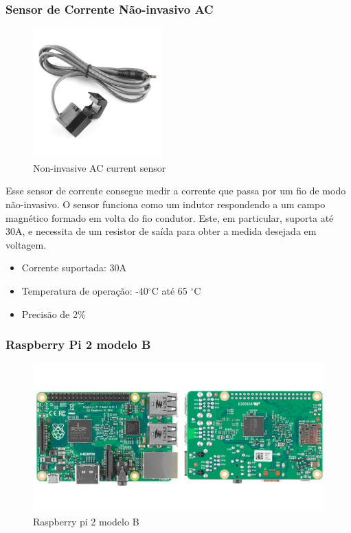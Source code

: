 \subsubsection{Sensor de Corrente Não-invasivo AC}
\begin{figure}[H]
\begin{center}
\includegraphics[width=5cm,height=5cm,keepaspectratio]{figuras/sensor.jpg}
\caption{\label{fig:sensor} Non-invasive AC current sensor}
\end{center}
\end{figure}

Esse sensor de corrente consegue medir a corrente que passa por um fio de modo não-invasivo. O sensor funciona como um indutor respondendo a um campo magnético formado em volta do fio condutor. Este, em particular, suporta até 30A, e necessita de um resistor de saída para obter a medida desejada em voltagem.

\begin{itemize}
\item{Corrente suportada: 30A}
\item{Temperatura de operação: -40$^{\circ}$C até 65 $^{\circ}$C}
\item{Precisão de 2\%}
\end{itemize}
%
\subsubsection{Raspberry Pi 2 modelo B}
\begin{figure}[H]
\includegraphics[width=1\textwidth]{figuras/raspberry_pi.png}
\caption{\label{fig:raspberry pi} Raspberry pi 2 modelo B}
\end{figure}

